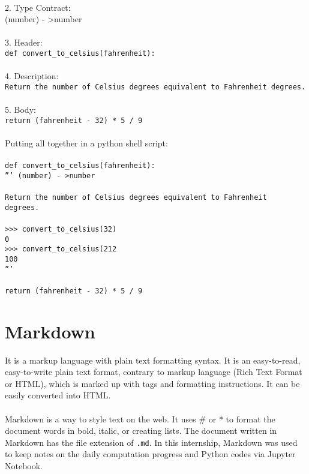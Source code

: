 \documentclass{article}
\begin{document}
{{{\\
2. Type Contract:\\
(number) - \textgreater  number\\
\\
3. Header:\\
\texttt{def convert\_to\_celsius(fahrenheit):}\\
\\
4. Description:\\
\texttt{Return the number of Celsius degrees equivalent to Fahrenheit degrees.}\\
\\
5. Body:\\
\texttt{return (fahrenheit - 32) * 5 / 9}\\
\\
Putting all together in a python shell script:\\
\\
\texttt{def convert\_to\_celsius(fahrenheit):}\\
\indent \indent \texttt{''' (number) - \textgreater  number }\\
\\
\indent \indent \texttt{Return the number of Celsius degrees equivalent to Fahrenheit \\
\indent \indent degrees.}\\
\\
\indent \indent \texttt{>>> convert\_to\_celsius(32)}\\
\indent \indent \texttt{0}\\
\indent \indent \texttt{>>> convert\_to\_celsius(212}\\
\indent \indent \texttt{100}\\
\indent \indent \texttt{'''}\\
\\
\indent \indent \texttt{return (fahrenheit - 32) * 5 / 9}

\newpage
\section{Markdown}
It is a markup language with plain text formatting syntax. It is an easy-to-read, easy-to-write plain text format, contrary to markup language (Rich Text Format or HTML), which is marked up with tags and formatting instructions. It can be easily converted into HTML. \\
\\
Markdown is a way to style text on the web. It uses \# or * to format the document words  in bold, italic, or creating lists. 
The document written in Markdown has the file extension of \texttt{.md}. In this internship, Markdown was used to keep notes on the daily computation progress and Python codes via Jupyter Notebook. \\

}}}
\end{document}
